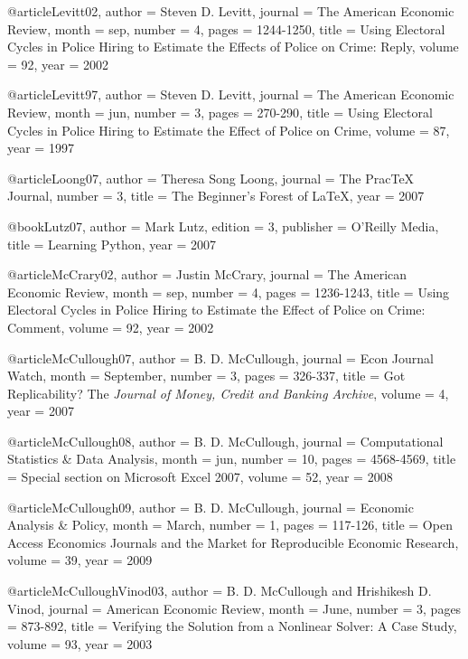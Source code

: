 @article{Levitt02,
author  = {Steven D. Levitt},
journal = {The American Economic Review},
month   = sep,
number  = {4},
pages   = {1244-1250},
title   = {Using Electoral Cycles in Police Hiring to Estimate the Effects of Police on Crime: Reply},
volume  = {92},
year    = {2002}
}

@article{Levitt97,
author  = {Steven D. Levitt},
journal = {The American Economic Review},
month   = jun,
number  = {3},
pages   = {270-290},
title   = {Using Electoral Cycles in Police Hiring to Estimate the Effect of Police on Crime},
volume  = {87},
year    = {1997}
}

@article{Loong07,
author  = {Theresa Song Loong},
journal = {The {Prac\TeX} Journal},
number  = {3},
title   = {The Beginner's Forest of {\LaTeX}},
year    = {2007}
}

@book{Lutz07,
author    = {Mark Lutz},
edition   = {3},
publisher = {O'Reilly Media},
title     = {Learning Python},
year      = {2007}
}

@article{McCrary02,
author  = {Justin {McCrary}},
journal = {The American Economic Review},
month   = sep,
number  = {4},
pages   = {1236-1243},
title   = {Using Electoral Cycles in Police Hiring to Estimate the Effect of Police on Crime: Comment},
volume  = {92},
year    = {2002}
}

@article{McCullough07,
author  = {B. D. {McCullough}},
journal = {Econ Journal Watch},
month   = {September},
number  = {3},
pages   = {326-337},
title   = {Got Replicability? {The} \emph{Journal of Money, Credit and Banking Archive}},
volume  = {4},
year    = {2007}
}

@article{McCullough08,
author  = {B. D. {McCullough}},
journal = {Computational Statistics \& Data Analysis},
month   = jun,
number  = {10},
pages   = {4568-4569},
title   = {Special section on {Microsoft Excel 2007}},
volume  = {52},
year    = {2008}
}

@article{McCullough09,
author  = {B. D. {McCullough}},
journal = {Economic Analysis \& Policy},
month   = {March},
number  = {1},
pages   = {117-126},
title   = {Open Access Economics Journals and the Market for Reproducible Economic Research},
volume  = {39},
year    = {2009}
}

@article{McCulloughVinod03,
author  = {B. D. {McCullough} and Hrishikesh D. Vinod},
journal = {American Economic Review},
month   = {June},
number  = {3},
pages   = {873-892},
title   = {Verifying the Solution from a Nonlinear Solver: A Case Study},
volume  = {93},
year    = {2003}
}

